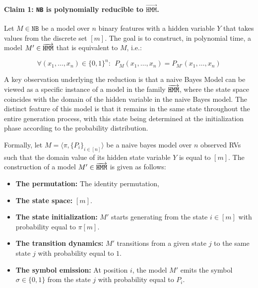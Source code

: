 \paragraph{Claim 1: \texttt{NB} is  polynomially reducible to $\overrightarrow{\texttt{HMM}}$.}

Let $M \in \texttt{NB}$ be a model over $n$ binary features with a hidden variable $Y$ that takes values from the discrete set $[m]$. The goal is to construct, in polynomial time, a model $M' \in \overrightarrow{\texttt{\text{HMM}}}$ that is equivalent to $M$, i.e.:


$$\forall (x_{1}, \ldots, x_{n}) \in \{0,1\}^{n}:~~P_{M}(x_{1}, \ldots, x_{n}) = P_{M'}(x_{1}, \ldots , x_{n})$$

A key observation underlying the reduction is that a naive Bayes Model can be viewed as a specific instance of a model in the family $\overrightarrow{\texttt{\text{HMM}}}$, where the state space coincides with the domain of the hidden variable in the naive Bayes model. The distinct feature of this model is that it remains in the same state throughout the entire generation process, with this state being determined at the initialization phase according to the probability distribution.


Formally, let $M = \langle\pi, \{P_{i}\}_{i \in [n]}\rangle$ be a naive bayes model over $n$ observed RVs such that the domain value of its hidden state variable $Y$ is equal to $[m]$.  The construction of a model $M' \in \overrightarrow{\texttt{\text{HMM}}} $ is given as follows:
\begin{itemize}
    \item \textbf{The permutation:} The identity permutation,
    \item \textbf{The state space:} $[m]$.
    \item \textbf{The state initialization:} $M'$ starts generating from the state $i \in [m]$ with probability equal to $\pi[m]$.
    \item \textbf{The transition dynamics:} $M'$ transitions from a given state $j$ to the same state $j$ with probability equal to $1$.
    \item \textbf{The symbol emission:} At position $i$, the model $M'$ emits the symbol $\sigma \in \{0,1\}$ from the state $j$ with probability equal to $P_{i}$. 
\end{itemize}

